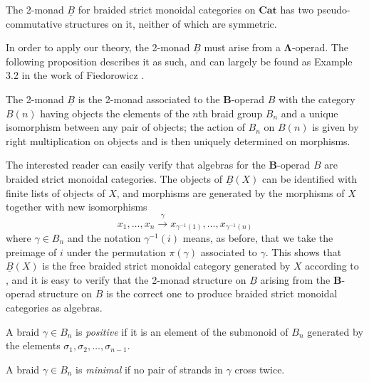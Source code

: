 \documentclass{amsbook} %
\newcommand{\mb}{\mathbf}
\newcommand{\ML}{\mathbf{\Lambda}}
\numberwithin{section}{chapter}
\begin{document}
\begin{thm}\label{braidpscomm}
The 2-monad $\underline{B}$ for braided strict monoidal categories on $\mb{Cat}$ has two pseudo-commutative structures on it, neither of which are symmetric.
\end{thm}

In order to apply our theory, the 2-monad $\underline{B}$ must arise from a $\ML$-operad.  The following proposition describes it as such, and can largely be found as Example 3.2 in the work of Fiedorowicz \cite{fie-br}.

\begin{prop}
The 2-monad $\underline{B}$ is the 2-monad associated to the $\mb{B}$-operad $B$ with the category $B(n)$ having objects the elements of the $n$th braid group $B_{n}$ and a unique isomorphism between any pair of objects; the action of $B_{n}$ on $B(n)$ is given by right multiplication on objects and is then uniquely determined on morphisms.
\end{prop}

The interested reader can easily verify that algebras for the $\mb{B}$-operad $B$ are braided strict monoidal categories.  The objects of $\underline{B}(X)$ can be identified with finite lists of objects of $X$, and morphisms are generated by the morphisms of $X$ together with new isomorphisms
\[
x_{1}, \ldots, x_{n} \stackrel{\gamma}{\longrightarrow} x_{\gamma^{-1}(1)}, \ldots, x_{\gamma^{-1}(n)}
\]
where $\gamma \in B_{n}$ and the notation $\gamma^{-1}(i)$ means, as before, that we take the preimage of $i$ under the permutation $\pi(\gamma)$ associated to $\gamma$.  This shows that $\underline{B}(X)$ is the free braided strict monoidal category generated by $X$ according to \cite{js}, and it is easy to verify that the 2-monad structure on $\underline{B}$ arising from the $\mb{B}$-operad structure on $B$ is the correct one to produce braided strict monoidal categories as algebras.



\begin{Defi}
A braid $\gamma \in B_{n}$ is \textit{positive} if it is an element of the submonoid of $B_{n}$ generated by the elements $\sigma_{1}, \sigma_{2}, \ldots, \sigma_{n-1}$.
\end{Defi}

\begin{Defi}
 A braid $\gamma \in B_{n}$ is \textit{minimal} if no pair of strands in $\gamma$ cross twice.
\end{Defi}
\end{document}
